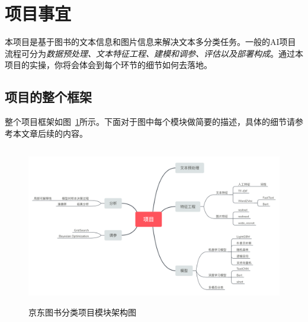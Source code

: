 \section{项目事宜}

\noindent 本项目是基于图书的文本信息和图片信息来解决文本多分类任务。一般的AI项目流程可分为\textit{数据预处理、文本特征工程、建模和调参、评估以及部署构成}。通过本项目的实操，你将会体会到每个环节的细节如何去落地。



\subsection{项目的整个框架}

\noindent 整个项目框架如图~\ref{fig:project_mindmap}所示。下面对于图中每个模块做简要的描述，具体的细节请参考本文章后续的内容。

\begin{figure}[ht]
 \centering
 \includegraphics[height=7cm]{images/project_mindmap.jpg}
 \caption{京东图书分类项目模块架构图}
 \label{fig:project_mindmap}
\end{figure}

